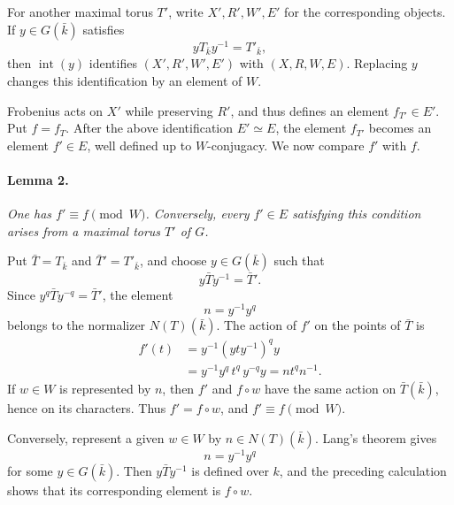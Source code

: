 For another maximal torus \(T'\), write \(X',R',W',E'\) for the
corresponding objects. If
\(y\in G(\bar k)\) satisfies
\[
  yT_{\bar k}y^{-1}=T'_{\bar k},
\]
then \(\operatorname{int}(y)\) identifies
\((X',R',W',E')\) with \((X,R,W,E)\). Replacing \(y\) changes
this identification by an element of \(W\).

Frobenius acts on \(X'\) while preserving \(R'\), and thus
defines an element \(f_{T'}\in E'\). Put \(f=f_T\). After the
above identification \(E'\simeq E\), the element \(f_{T'}\)
becomes an element \(f'\in E\), well defined up to
\(W\)-conjugacy. We now compare \(f'\) with \(f\).



\paragraph{\textbf{Lemma 2.}}
{\itshape One has \(f'\equiv f\pmod W\). Conversely, every
\(f'\in E\) satisfying this condition arises from a maximal torus
\(T'\) of \(G\).}

Put \(\bar T=T_{\bar k}\) and \(\bar T'=T'_{\bar k}\), and choose
\(y\in G(\bar k)\) such that
\[
  y\bar T y^{-1}=\bar T'.
\]
Since \(y^q\bar T y^{-q}=\bar T'\), the element
\[
  n=y^{-1}y^q
\]
belongs to the normalizer \(N(T)(\bar k)\). The action of \(f'\)
on the points of \(\bar T\) is
\[
 \begin{aligned}
  f'(t)
    &=y^{-1}(yty^{-1})^q y\\
    &=y^{-1}y^q\,t^q\,y^{-q}y
      =nt^qn^{-1}.
 \end{aligned}
\]
If \(w\in W\) is represented by \(n\), then \(f'\) and
\(f\circ w\) have the same action on \(\bar T(\bar k)\), hence
on its characters. Thus \(f'=f\circ w\), and
\(f'\equiv f\pmod W\).

Conversely, represent a given \(w\in W\) by
\(n\in N(T)(\bar k)\). Lang's theorem gives
\[
  n=y^{-1}y^q
\]
for some \(y\in G(\bar k)\). Then
\(y\bar T y^{-1}\) is defined over \(k\), and the preceding
calculation shows that its corresponding element is
\(f\circ w\).

